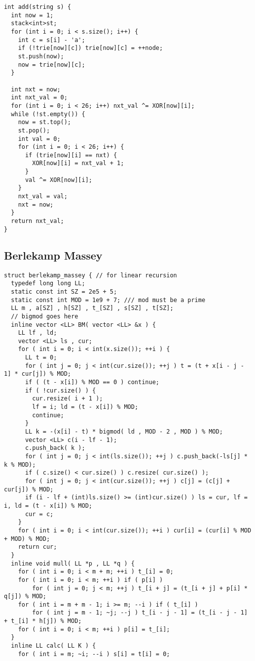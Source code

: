 \documentclass[10pt,a4paper,onesided]{article}
\begin{document}
\begin{multicols*}{3}
\begin{lstlisting}
int add(string s) {
  int now = 1;
  stack<int>st;
  for (int i = 0; i < s.size(); i++) {
    int c = s[i] - 'a';
    if (!trie[now][c]) trie[now][c] = ++node;
    st.push(now);
    now = trie[now][c];
  }

  int nxt = now;
  int nxt_val = 0;
  for (int i = 0; i < 26; i++) nxt_val ^= XOR[now][i];
  while (!st.empty()) {
    now = st.top();
    st.pop();
    int val = 0;
    for (int i = 0; i < 26; i++) {
      if (trie[now][i] == nxt) {
        XOR[now][i] = nxt_val + 1;
      }
      val ^= XOR[now][i];
    }
    nxt_val = val;
    nxt = now;
  }
  return nxt_val;
}
\end{lstlisting}
\subsection{Berlekamp Massey}
\begin{lstlisting}
struct berlekamp_massey { // for linear recursion
  typedef long long LL;
  static const int SZ = 2e5 + 5;
  static const int MOD = 1e9 + 7; /// mod must be a prime
  LL m , a[SZ] , h[SZ] , t_[SZ] , s[SZ] , t[SZ];
  // bigmod goes here
  inline vector <LL> BM( vector <LL> &x ) {
    LL lf , ld;
    vector <LL> ls , cur;
    for ( int i = 0; i < int(x.size()); ++i ) {
      LL t = 0;
      for ( int j = 0; j < int(cur.size()); ++j ) t = (t + x[i - j - 1] * cur[j]) % MOD;
      if ( (t - x[i]) % MOD == 0 ) continue;
      if ( !cur.size() ) {
        cur.resize( i + 1 );
        lf = i; ld = (t - x[i]) % MOD;
        continue;
      }
      LL k = -(x[i] - t) * bigmod( ld , MOD - 2 , MOD ) % MOD;
      vector <LL> c(i - lf - 1);
      c.push_back( k );
      for ( int j = 0; j < int(ls.size()); ++j ) c.push_back(-ls[j] * k % MOD);
      if ( c.size() < cur.size() ) c.resize( cur.size() );
      for ( int j = 0; j < int(cur.size()); ++j ) c[j] = (c[j] + cur[j]) % MOD;
      if (i - lf + (int)ls.size() >= (int)cur.size() ) ls = cur, lf = i, ld = (t - x[i]) % MOD;
      cur = c;
    }
    for ( int i = 0; i < int(cur.size()); ++i ) cur[i] = (cur[i] % MOD + MOD) % MOD;
    return cur;
  }
  inline void mull( LL *p , LL *q ) {
    for ( int i = 0; i < m + m; ++i ) t_[i] = 0;
    for ( int i = 0; i < m; ++i ) if ( p[i] )
        for ( int j = 0; j < m; ++j ) t_[i + j] = (t_[i + j] + p[i] * q[j]) % MOD;
    for ( int i = m + m - 1; i >= m; --i ) if ( t_[i] )
        for ( int j = m - 1; ~j; --j ) t_[i - j - 1] = (t_[i - j - 1] + t_[i] * h[j]) % MOD;
    for ( int i = 0; i < m; ++i ) p[i] = t_[i];
  }
  inline LL calc( LL K ) {
    for ( int i = m; ~i; --i ) s[i] = t[i] = 0;

\end{lstlisting}
\end{multicols*}
\end{document}

